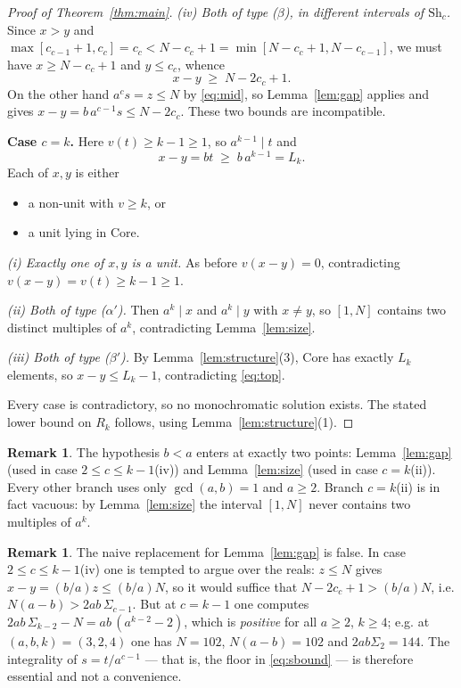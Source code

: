 \documentclass{amsart}
\theoremstyle{definition}
\newtheorem{remark}[theorem]{Remark}
\newcommand{\Sh}{\mathrm{Sh}}
\newcommand{\Core}{\mathrm{Core}}
\newcommand{\Rk}{R_k}
\begin{document}
\begin{proof}[Proof of Theorem~\ref{thm:main}]
\emph{(iv) Both of type ($\beta$), in different intervals of $\Sh_c$.}  Since
$x>y$ and $\max[c_{c-1}+1,c_c]=c_c<N-c_c+1=\min[N-c_c+1,N-c_{c-1}]$, we must
have $x\ge N-c_c+1$ and $y\le c_c$, whence
\[
  x-y\;\ge\;N-2c_c+1 .
\]
On the other hand $a^{c}s=z\le N$ by \eqref{eq:mid}, so Lemma~\ref{lem:gap}
applies and gives $x-y=b\,a^{c-1}s\le N-2c_c$.  These two bounds are
incompatible.

\smallskip
\noindent\textbf{Case $c=k$.}  Here $v(t)\ge k-1\ge1$, so $a^{k-1}\mid t$ and
\begin{equation}\label{eq:top}
  x-y=bt\;\ge\;b\,a^{k-1}=L_k .
\end{equation}
Each of $x,y$ is either
\begin{itemize}
\item[($\alpha'$)] a non-unit with $v\ge k$, or
\item[($\beta'$)] a unit lying in $\Core$.
\end{itemize}

\emph{(i) Exactly one of $x,y$ is a unit.}  As before $v(x-y)=0$, contradicting
$v(x-y)=v(t)\ge k-1\ge1$.

\emph{(ii) Both of type ($\alpha'$).}  Then $a^{k}\mid x$ and $a^{k}\mid y$
with $x\ne y$, so $[1,N]$ contains two distinct multiples of $a^{k}$,
contradicting Lemma~\ref{lem:size}.

\emph{(iii) Both of type ($\beta'$).}  By Lemma~\ref{lem:structure}(3),
$\Core$ has exactly $L_k$ elements, so $x-y\le L_k-1$, contradicting
\eqref{eq:top}.

\smallskip
Every case is contradictory, so no monochromatic solution exists.  The stated
lower bound on $\Rk$ follows, using Lemma~\ref{lem:structure}(1).
\end{proof}

\begin{remark}
The hypothesis $b<a$ enters at exactly two points: Lemma~\ref{lem:gap} (used in
case $2\le c\le k-1$(iv)) and Lemma~\ref{lem:size} (used in case $c=k$(ii)).
Every other branch uses only $\gcd(a,b)=1$ and $a\ge2$.  Branch $c=k$(ii) is in
fact vacuous: by Lemma~\ref{lem:size} the interval $[1,N]$ never contains two
multiples of $a^{k}$.
\end{remark}

\begin{remark}\label{rem:naive}
The naive replacement for Lemma~\ref{lem:gap} is false.  In case
$2\le c\le k-1$(iv) one is tempted to argue over the reals: $z\le N$ gives
$x-y=(b/a)z\le (b/a)N$, so it would suffice that $N-2c_c+1>(b/a)N$, i.e.
$N(a-b)>2ab\,\Sigma_{c-1}$.  But at $c=k-1$ one computes
$2ab\,\Sigma_{k-2}-N=ab\,(a^{k-2}-2)$, which is \emph{positive} for all
$a\ge2$, $k\ge4$; e.g. at $(a,b,k)=(3,2,4)$ one has $N=102$, $N(a-b)=102$ and
$2ab\Sigma_2=144$.  The integrality of $s=t/a^{c-1}$ --- that is, the floor in
\eqref{eq:sbound} --- is therefore essential and not a convenience.
\end{remark}
\end{document}
